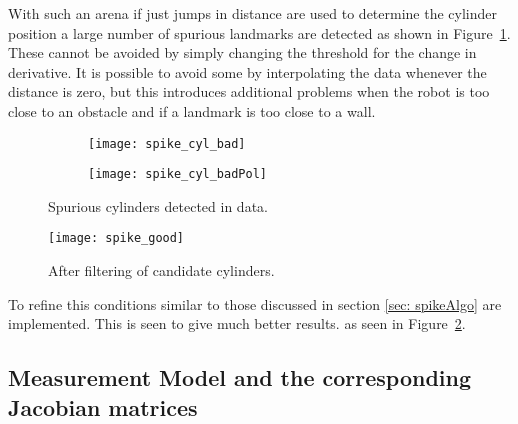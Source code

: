 With such an arena if just jumps in distance are used to determine the cylinder position a large number of spurious landmarks are detected as shown in Figure~\ref{fig:Spike_cylinders_bad}. These cannot be avoided by simply changing the threshold for the change in derivative. It is possible to avoid some by interpolating the data whenever the distance is zero, but this introduces additional problems when the robot is too close to an obstacle and if a landmark is too close to a wall. 

\begin{figure}[h!]
    \centering
    \begin{subfigure}[b]{0.45\textwidth}
	\texttt{[image: spike\_cyl\_bad]}
    \end{subfigure}
    \quad %
    \begin{subfigure}[b]{0.45\textwidth}
        \texttt{[image: spike\_cyl\_badPol]}
    \end{subfigure}%
	\caption{Spurious cylinders detected in data.}
	\label{fig:Spike_cylinders_bad}
\end{figure}

\begin{figure}[h!]
\centering
\texttt{[image: spike\_good]}
\caption{After filtering of candidate cylinders.}
\label{fig:spike_good}
\end{figure}

To refine this conditions similar to those discussed in section \ref{sec: spikeAlgo} are implemented. This is seen to give much better results. as seen in Figure~\ref{fig:spike_good}. 



\subsection{Measurement Model and the corresponding Jacobian matrices}
\label{sec:Spike_math}

